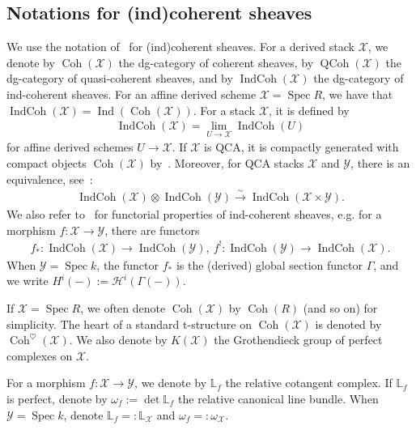 \documentclass [11pt,oneside,a4paper,mathscr]{amsart}
\theoremstyle{definition}
\newcommand{\Y}{\mathcal{Y}}
\newcommand{\QCoh}{\operatorname{QCoh}}
\newcommand{\X}{\mathcal{X}}
\newcommand{\Coh}{\operatorname{Coh}}
\newcommand{\Ind}{\operatorname{Ind}}
\newcommand{\IndCoh}{\operatorname{IndCoh}}
\newcommand{\Spec}{\operatorname{Spec}}
\begin{document}
\subsection{Notations for (ind)coherent sheaves}
We use the notation of~\cite{MR3701352} for (ind)coherent sheaves. 
For a derived stack $\X$, we denote by 
$\Coh(\X)$ the dg-category of coherent sheaves,
by $\QCoh(\X)$ the dg-category of quasi-coherent sheaves,
and by $\IndCoh(\X)$ the dg-category of ind-coherent sheaves. 
For an affine derived scheme $\X=\Spec R$, we have that 
$\IndCoh(\X)=\Ind(\Coh(\X))$. For a stack $\X$, it is defined by 
\begin{align*}
    \IndCoh(\X)=\lim_{U\to \X}\IndCoh(U)
\end{align*}
for affine derived schemes $U \to \X$. If $\X$ is QCA, it is compactly generated with 
compact objects $\Coh(\X)$ by~\cite{MR3037900}.
Moreover, for QCA stacks $\mathcal{X}$ and $\mathcal{Y}$, there is an equivalence, 
see~\cite[Corollary~4.2.3]{MR3037900}:
\begin{align}\label{indtensor}
    \IndCoh(\mathcal{X})\otimes \IndCoh(\mathcal{Y}) \stackrel{\sim}{\to}\IndCoh(\mathcal{X}\times \mathcal{Y}).
\end{align}
We also refer to~\cite{MR3037900} for functorial properties of ind-coherent sheaves, e.g. 
for a morphism $f\colon \X \to \Y$, there are functors 
\begin{align*}
    f_{*}\colon \IndCoh(\X) \to \IndCoh(\Y), \ f^! \colon \IndCoh(\Y) \to \IndCoh(\X).
\end{align*}
When $\Y=\Spec k$, the functor $f_{*}$ is the (derived) global section functor 
$\Gamma$, and we write $H^i(-):=\mathcal{H}^i(\Gamma(-))$. 

If $\X=\Spec R$, we often denote $\Coh(\X)$ by $\Coh(R)$ (and so on) for simplicity. 
The heart of a standard t-structure on $\Coh(\X)$ is denoted by 
$\Coh^{\heartsuit}(\X)$. 
We also denote by $K(\mathcal{X})$ the Grothendieck group of 
perfect complexes on $\mathcal{X}$. 

For a morphism $f\colon \X \to \Y$, we denote by $\mathbb{L}_f$ the relative 
cotangent complex. If $\mathbb{L}_f$ is perfect, denote by $\omega_f:=\det \mathbb{L}_f$ the 
relative canonical line bundle. 
When $\Y=\Spec k$, denote $\mathbb{L}_f=:\mathbb{L}_{\X}$ and $\omega_f=:\omega_{\X}$. 
\end{document}
